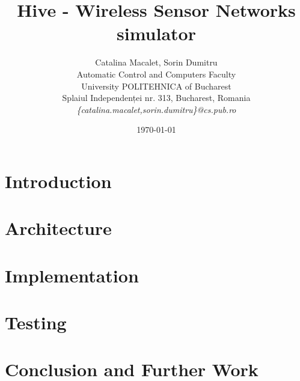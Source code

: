 \documentclass[12pt]{article}
\title{Hive - Wireless Sensor Networks simulator}
\author{Catalina Macalet, Sorin Dumitru\\
Automatic Control and Computers Faculty\\
University POLITEHNICA of Bucharest\\
Splaiul Independenței nr. 313, Bucharest, Romania \\
\emph{\{catalina.macalet,sorin.dumitru\}@cs.pub.ro}}
\date{\today}
\begin{document}
\maketitle

\begin{abstract}

\end{abstract}

\section{Introduction}
\label{sec:introduction}


\section{Architecture}
\label{sec:architecture}


\section{Implementation}
\label{sec:implementation}


%

%

\section{Testing}
\label{sec:testing}


\section{Conclusion and Further Work}
\label{sec:conclusion}




\end{document}
